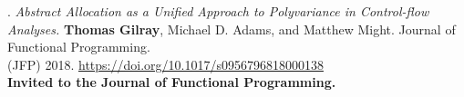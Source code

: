 \paper. \textit{Abstract Allocation as a Unified Approach to Polyvariance in Control-flow Analyses.}
\textbf{Thomas Gilray}, Michael D. Adams, and Matthew Might.
Journal of Functional Programming.
\\(JFP) 2018. \url{https://doi.org/10.1017/s0956796818000138}
\\\textbf{Invited to the Journal of Functional Programming.} \\ \vspace{-0.1cm}\\

